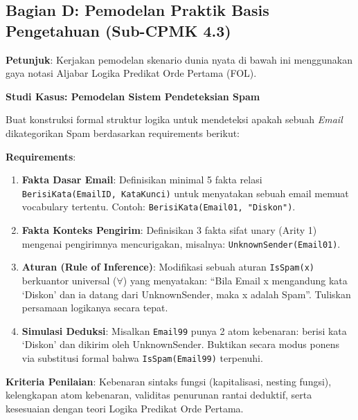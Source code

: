 \subsection{Bagian D: Pemodelan Praktik Basis Pengetahuan (Sub-CPMK 4.3)}

\textbf{Petunjuk}: Kerjakan pemodelan skenario dunia nyata di bawah ini menggunakan gaya notasi Aljabar Logika Predikat Orde Pertama (FOL).

\textbf{Studi Kasus: Pemodelan Sistem Pendeteksian Spam}

Buat konstruksi formal struktur logika untuk mendeteksi apakah sebuah \textit{Email} dikategorikan Spam berdasarkan requirements berikut:

\textbf{Requirements}:
\begin{enumerate}
  \item \textbf{Fakta Dasar Email}: Definisikan minimal 5 fakta relasi \texttt{BerisiKata(EmailID, KataKunci)} untuk menyatakan sebuah email memuat vocabulary tertentu. Contoh: \texttt{BerisiKata(Email01, "Diskon")}.
  \item \textbf{Fakta Konteks Pengirim}: Definisikan 3 fakta sifat unary (Arity 1) mengenai pengirimnya mencurigakan, misalnya: \texttt{UnknownSender(Email01)}.
  \item \textbf{Aturan (Rule of Inference)}: Modifikasi sebuah aturan \texttt{IsSpam(x)} berkuantor universal ($\forall$) yang menyatakan: ``Bila Email x mengandung kata `Diskon' dan ia datang dari UnknownSender, maka x adalah Spam''. Tuliskan persamaan logikanya secara tepat.
  \item \textbf{Simulasi Deduksi}: Misalkan \texttt{Email99} punya 2 atom kebenaran: berisi kata `Diskon' dan dikirim oleh UnknownSender. Buktikan secara modus ponens via substitusi formal bahwa \texttt{IsSpam(Email99)} terpenuhi.
\end{enumerate}

\textbf{Kriteria Penilaian}: Kebenaran sintaks fungsi (kapitalisasi, nesting fungsi), kelengkapan atom kebenaran, validitas penurunan rantai deduktif, serta kesesuaian dengan teori Logika Predikat Orde Pertama.
